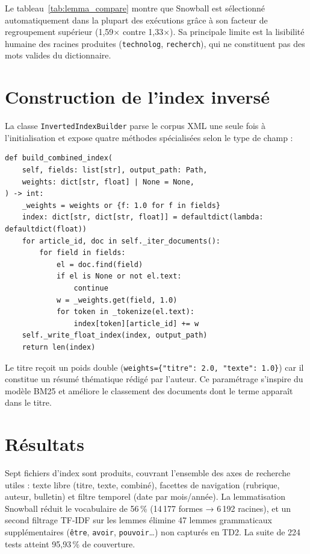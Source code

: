 Le tableau~\ref{tab:lemma_compare} montre que Snowball est sélectionné automatiquement
dans la plupart des exécutions grâce à son facteur de regroupement supérieur (1,59$\times$
contre 1,33$\times$). Sa principale limite est la lisibilité humaine des racines
produites (\texttt{technolog}, \texttt{recherch}), qui ne constituent pas des mots
valides du dictionnaire.

\section{Construction de l'index inversé}

La classe \texttt{InvertedIndexBuilder} parse le corpus XML une seule fois à
l'initialisation et expose quatre méthodes spécialisées selon le type de champ :

\begin{lstlisting}[caption={Index pondéré multi-champs : titre$\times$2 + texte$\times$1},
  label={lst:combined_index}]
def build_combined_index(
    self, fields: list[str], output_path: Path,
    weights: dict[str, float] | None = None,
) -> int:
    _weights = weights or {f: 1.0 for f in fields}
    index: dict[str, dict[str, float]] = defaultdict(lambda: defaultdict(float))
    for article_id, doc in self._iter_documents():
        for field in fields:
            el = doc.find(field)
            if el is None or not el.text:
                continue
            w = _weights.get(field, 1.0)
            for token in _tokenize(el.text):
                index[token][article_id] += w
    self._write_float_index(index, output_path)
    return len(index)
\end{lstlisting}

Le titre reçoit un poids double (\texttt{weights=\{"titre":~2.0,~"texte":~1.0\}}) car
il constitue un résumé thématique rédigé par l'auteur. Ce paramétrage s'inspire du
modèle BM25 et améliore le classement des documents dont le terme apparaît dans le
titre.

\section{Résultats}

Sept fichiers d'index sont produits, couvrant l'ensemble des axes de recherche utiles :
texte libre (titre, texte, combiné), facettes de navigation (rubrique, auteur, bulletin)
et filtre temporel (date par mois/année). La lemmatisation Snowball réduit le vocabulaire
de 56\,\% (14\,177 formes → 6\,192 racines), et un second filtrage TF-IDF sur les lemmes
élimine 47 lemmes grammaticaux supplémentaires (\texttt{être}, \texttt{avoir},
\texttt{pouvoir}\ldots) non capturés en TD2. La suite de 224 tests atteint 95,93\,\% de
couverture.
